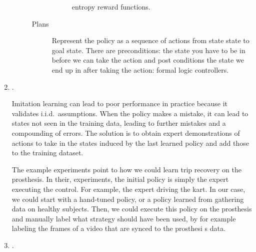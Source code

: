 \begin{enumerate}
\begin{description}
\begin{description}
\begin{description}
                            entropy reward functions.
                    \end{description}
                \item[Plans] 
                    Represent the policy as a sequence of actions from state
                    state to goal state. There are preconditions: the state you
                    have to be in before we can take the action and post
                    conditions the state we end up in after taking the action:
                    formal logic controllers.
            \end{description}
    \end{description}

    \item {}. 
    
    
    Imitation learning can lead to poor performance in practice because it
    validates i.i.d.\ assumptions. When the policy makes a mistake, it can lead
    to states not seen in the training data, leading to further mistakes and a
    compounding of errors. The solution is to obtain expert demonstrations of
    actions to take in the states induced by the last learned policy and add
    those to the training dataset.

    The example experiments point to how we could learn trip recovery on the
    prosthesis. In their, experiments, the initial policy is simply the expert
    executing the control. For example, the expert driving the kart. In our
    case, we could start with a hand-tuned policy, or a policy learned from
    gathering data on healthy subjects. Then, we could execute this policy on
    the prosthesis and manually label what strategy should have been used, by
    for example labeling the frames of a video that are synced to the prosthesi
    s data.

    \item {}. 
    
    

\end{enumerate}
